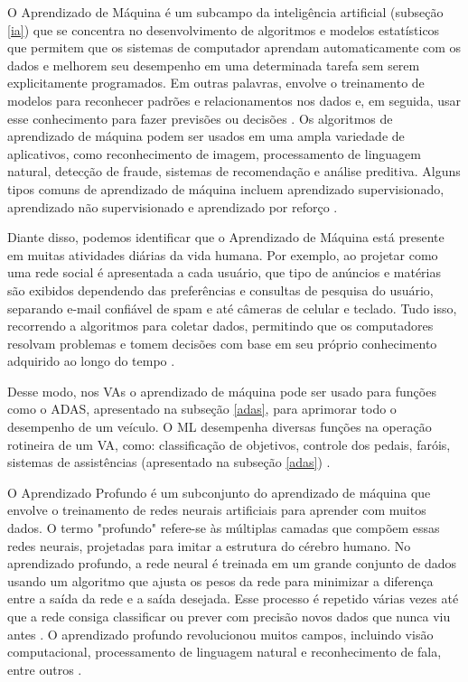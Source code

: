  \label{machine}

O Aprendizado de Máquina é um subcampo da inteligência artificial (subseção \ref{ia}) que se concentra no desenvolvimento de algoritmos e modelos estatísticos que permitem que os sistemas de computador aprendam automaticamente com os dados e melhorem seu desempenho em uma determinada tarefa sem serem explicitamente programados. Em outras palavras, envolve o treinamento de modelos para reconhecer padrões e relacionamentos nos dados e, em seguida, usar esse conhecimento para fazer previsões ou decisões \cite{review-auto}. Os algoritmos de aprendizado de máquina podem ser usados em uma ampla variedade de aplicativos, como reconhecimento de imagem, processamento de linguagem natural, detecção de fraude, sistemas de recomendação e análise preditiva. Alguns tipos comuns de aprendizado de máquina incluem aprendizado supervisionado, aprendizado não supervisionado e aprendizado por reforço \cite{software-review, software-cnn}.

Diante disso, podemos identificar que o Aprendizado de Máquina está presente em muitas atividades diárias da vida humana. Por exemplo, ao projetar como uma rede social é apresentada a cada usuário, que tipo de anúncios e matérias são exibidos dependendo das preferências e consultas de pesquisa do usuário, separando e-mail confiável de spam e até câmeras de celular e teclado. Tudo isso, recorrendo a algoritmos para coletar dados, permitindo que os computadores resolvam problemas e tomem decisões com base em seu próprio conhecimento adquirido ao longo do tempo \cite{caio}.

Desse modo, nos VAs o aprendizado de máquina pode ser usado para funções como o ADAS, apresentado na subseção \ref{adas}, para aprimorar todo o desempenho de um veículo. O ML desempenha diversas funções na operação rotineira de um VA, como: classificação de objetivos, controle dos pedais, faróis, sistemas de assistências (apresentado na subseção \ref{adas}) \cite{aplicacao2}.

 \label{Profunda}

O Aprendizado Profundo é um subconjunto do aprendizado de máquina que envolve o treinamento de redes neurais artificiais para aprender com muitos dados. O termo "profundo" refere-se às múltiplas camadas que compõem essas redes neurais, projetadas para imitar a estrutura do cérebro humano. No aprendizado profundo, a rede neural é treinada em um grande conjunto de dados usando um algoritmo que ajusta os pesos da rede para minimizar a diferença entre a saída da rede e a saída desejada. Esse processo é repetido várias vezes até que a rede consiga classificar ou prever com precisão novos dados que nunca viu antes \cite{software-cnn}. O aprendizado profundo revolucionou muitos campos, incluindo visão computacional, processamento de linguagem natural e reconhecimento de fala, entre outros \cite{review-auto, software-review}. 

